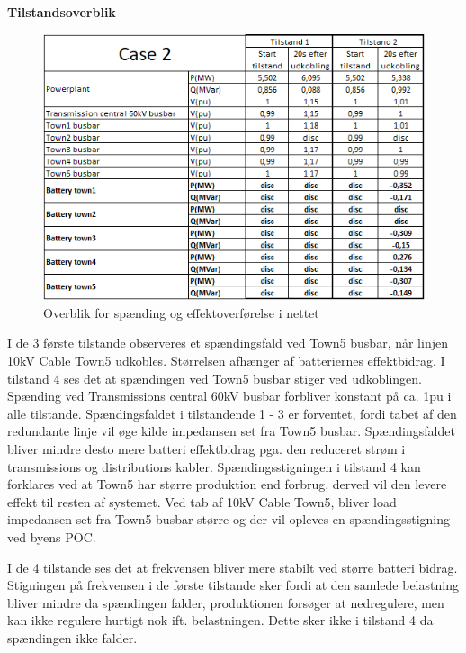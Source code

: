 \textbf{Tilstandsoverblik}
\begin{figure}[H] %
	\centering
	\includegraphics[width=1\textwidth]{figurer/LossOfTown/Overview}
	\caption{Overblik for spænding og effektoverførelse i nettet}
	\label{fig:C2Overview}
\end{figure}


I de 3 første tilstande observeres et spændingsfald ved Town5 busbar, når linjen 10kV Cable Town5 udkobles. Størrelsen afhænger af batteriernes effektbidrag. I tilstand 4 ses det at spændingen ved Town5 busbar stiger ved udkoblingen. Spænding ved Transmissions central 60kV busbar forbliver konstant på ca. 1pu i alle tilstande. Spændingsfaldet i tilstandende 1 - 3 er forventet, fordi tabet af den redundante linje vil øge kilde impedansen set fra Town5 busbar. Spændingsfaldet bliver mindre desto mere batteri effektbidrag pga. den reduceret strøm i transmissions og distributions kabler. Spændingsstigningen i tilstand 4 kan forklares ved at Town5 har større produktion end forbrug, derved vil den levere effekt til resten af systemet. Ved tab af 10kV Cable Town5, bliver load impedansen set fra Town5 busbar større og der vil opleves en spændingsstigning ved byens POC.

I de 4 tilstande ses det at frekvensen bliver mere stabilt ved større batteri bidrag. Stigningen på frekvensen i de første tilstande sker fordi at den samlede belastning bliver mindre da spændingen falder, produktionen forsøger at nedregulere, men kan ikke regulere hurtigt nok ift. belastningen. Dette sker ikke i tilstand 4 da spændingen ikke falder.   
